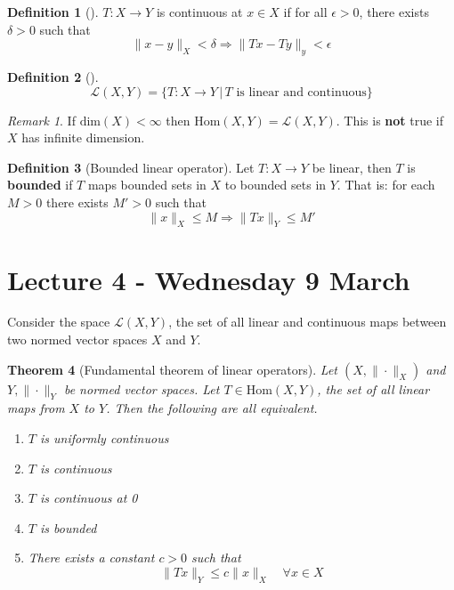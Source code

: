 \documentclass[10pt, reqno, oneside]{amsart}
\theoremstyle{plain}%
\newtheorem{thm}{Theorem}[section]
\theoremstyle{definition}
\newtheorem{defn}[thm]{Definition}
\theoremstyle{remark}
\newtheorem*{rem}{Remark}
\begin{document}
\begin{defn}[]
	$T: X \rightarrow Y$ is continuous at $x \in X$ if for all $\epsilon > 0$, there exists $\delta > 0$ such that \[
			\| x - y \|_X < \delta \Rightarrow \| Tx - Ty \|_y < \epsilon 
	\]
\end{defn}

\begin{defn}[]
	\[
	\mathcal{L}(X,Y) = \{ T:  X \rightarrow Y \, | \, \text{$T$ is linear and continuous} \}
	\]
\end{defn}

\begin{rem}
	If $\text{dim}(X) < \infty$ then $\text{Hom}(X,Y) = \mathcal{L}(X,Y)$.  This is \textbf{not} true if $X$ has infinite dimension.
\end{rem}

\begin{defn}[Bounded linear operator]
	Let $T: X \rightarrow Y$ be linear, then $T$ is \textbf{bounded} if $T$ maps bounded sets in $X$ to bounded sets in $Y$.  That is: for each $M > 0$ there exists $M' > 0$ such that \[
		\| x \|_X \leq M \Rightarrow \|Tx\|_Y \leq M'
	\]
\end{defn}

\section{Lecture 4 - Wednesday 9 March } %
\label{sec:lecture_4_}
Consider the space $\mathcal{L}(X, Y)$, the set of all linear and continuous maps between two normed vector spaces $X$ and $Y$.  

\begin{thm}[Fundamental theorem of linear operators]
	Let $( X, \| \cdot \|_X)$ and $Y, \| \cdot \|_Y$ be normed vector spaces.  Let $ T \in \text{Hom}(X,Y)$, the set of all linear maps from $X$ to $Y$.  Then the following are all equivalent.
	\begin{enumerate}[1)]
		\item $T$ is uniformly continuous
		\item $T$ is continuous
		\item $T$ is continuous at 0
		\item $T$ is bounded
		\item There exists a constant $c > 0$ such that \[
			\| Tx \|_Y \leq c \| x \|_X \quad \forall x \in X
		\]
	\end{enumerate}
\end{thm}
\end{document}
